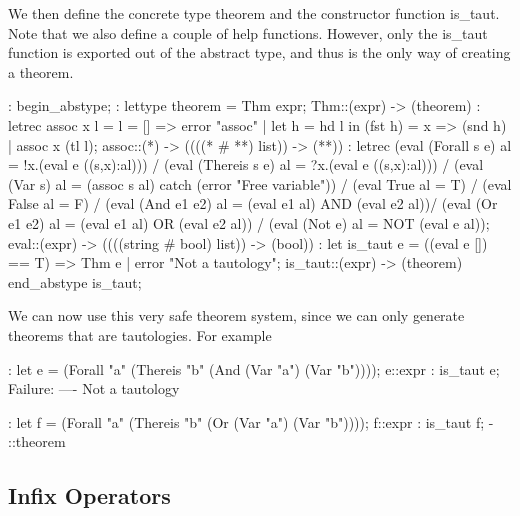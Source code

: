 We then define the concrete type theorem and the constructor function
is\_taut. Note that we
also define a couple of help functions. However, only the is\_taut function
is exported out of the
abstract type, and thus is the only way of creating a theorem.
\begin{hol}
: begin_abstype;
: lettype theorem = Thm expr;
Thm::(expr) -> (theorem)
: letrec assoc x l = l = [] => error "assoc" |
                let h = hd l in
                (fst h) = x => (snd h) | assoc x (tl l);
assoc::(*) -> ((((* # **) list)) -> (**))
: letrec  (eval (Forall s e) al = !x.(eval e ((s,x):al))) /\verb@\@
        (eval (Thereis s e) al = ?x.(eval e ((s,x):al))) /\verb@\@
        (eval (Var s) al = (assoc s al) catch
                                   (error "Free variable")) /\verb@\@
        (eval True al = T) /\verb@\@
        (eval False al = F) /\verb@\@
        (eval (And e1 e2) al = (eval e1 al) AND (eval e2 al))/\verb@\@
        (eval (Or e1 e2) al = (eval e1 al) OR (eval e2 al)) /\verb@\@
        (eval (Not e) al = NOT (eval e al));
eval::(expr) -> ((((string # bool) list)) -> (bool))
: let is_taut e = ((eval e []) == T) => Thm e |
                                       error "Not a tautology";
is_taut::(expr) -> (theorem)
end_abstype is_taut;
\end{hol}

We can now use this very safe theorem system, since we can only generate
theorems that are
tautologies. For example
\begin{hol}
: let e = (Forall "a" (Thereis "b" (And (Var "a") (Var "b"))));
e::expr
: is_taut e;
Failure:    ----   Not a tautology


: let f = (Forall "a" (Thereis "b" (Or (Var "a") (Var "b"))));
f::expr
: is_taut f;
- ::theorem
\end{hol}

\subsection{Infix Operators}

